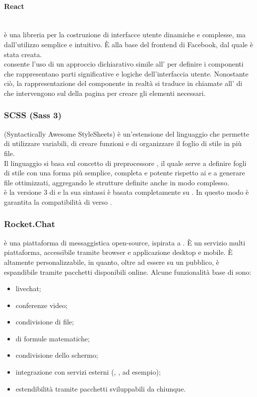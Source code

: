 \paragraph{React}\mbox{}\\
 è una libreria  per la costruzione di interfacce utente dinamiche e complesse, ma dall'utilizzo semplice e intuitivo. \`{E} alla base del frontend di Facebook, dal quale è stata creata.\\
 consente l'uso di un approccio dichiarativo simile all' per definire i componenti che rappresentano parti significative e logiche dell'interfaccia utente. Nonostante ciò, la rappresentazione del componente in realtà si traduce in chiamate all' di  che intervengono sul  della pagina per creare gli elementi necessari.

\subsubsection{SCSS (Sass 3)}
 (Syntactically Awesome StyleSheets) è un'estensione del linguaggio  che permette di utilizzare variabili, di creare funzioni e di organizzare il foglio di stile in più file.\\
Il linguaggio  si basa sul concetto di preprocessore , il quale serve a definire fogli di stile con una forma più semplice, completa e potente rispetto ai  e a generare file  ottimizzati, aggregando le strutture definite anche in modo complesso.\\
 è la versione 3 di  e la sua sintassi è basata completamente su . In questo modo è garantita la compatibilità di  verso .

\subsubsection{Rocket.Chat}
 è una piattaforma di messaggistica open-source, ispirata a . \`{E} un servizio multi piattaforma, accessibile tramite browser e applicazione desktop e mobile. \`{E} altamente personalizzabile, in quanto, oltre ad essere su un  pubblico, è espandibile tramite pacchetti disponibili online. Alcune funzionalità base di  sono:
\begin{itemize}
	\item livechat;
	\item conferenze video;
	\item condivisione di file;
	\item {} di formule matematiche;
	\item condivisione dello schermo;
	\item integrazione con servizi esterni (, ,  ad esempio);
	\item estendibilità tramite pacchetti sviluppabili da chiunque.
\end{itemize}

